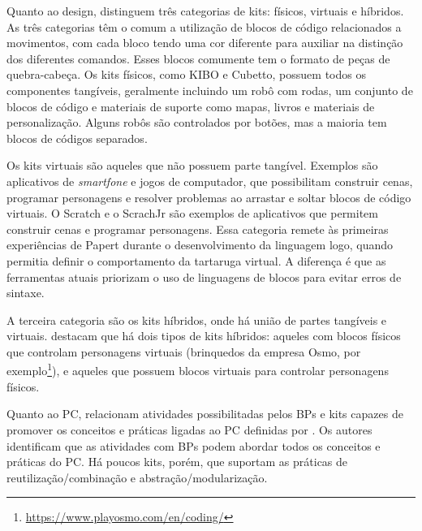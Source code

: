 Quanto ao design,  distinguem três categorias de kits: físicos, virtuais e híbridos. As três categorias têm o comum a utilização de blocos de código relacionados a movimentos, com cada bloco tendo uma cor diferente para auxiliar na distinção dos diferentes
comandos. Esses blocos comumente tem o formato de peças de quebra-cabeça. Os kits físicos, como KIBO e Cubetto, possuem todos os componentes tangíveis, geralmente incluindo um robô com rodas, um conjunto de blocos de código e materiais de suporte como mapas, livros e materiais de personalização. Alguns robôs são controlados por botões, mas a maioria tem blocos de códigos separados.

Os kits virtuais são aqueles que não possuem parte tangível. Exemplos são aplicativos de \textit{smartfone} e jogos de computador, que possibilitam construir cenas, programar personagens e resolver problemas ao arrastar e soltar blocos de código virtuais. O Scratch e o ScrachJr são exemplos de aplicativos que permitem construir cenas e programar personagens. Essa categoria remete às primeiras experiências de Papert durante o desenvolvimento da linguagem logo, quando permitia definir o comportamento da tartaruga virtual. A diferença é que as ferramentas atuais
priorizam o uso de linguagens de blocos para evitar erros de sintaxe.

A terceira categoria são os kits híbridos, onde há união de partes tangíveis e virtuais.  destacam que há dois tipos de kits híbridos: aqueles com blocos físicos que controlam personagens virtuais (brinquedos da empresa Osmo, por exemplo\footnote{\url{https://www.playosmo.com/en/coding/}}), e aqueles que possuem blocos virtuais para controlar personagens físicos.

Quanto ao \acl{PC},  relacionam atividades possibilitadas pelos BPs e kits capazes de promover os conceitos e práticas ligadas ao \ac{PC} definidas por . Os autores identificam que as atividades com BPs podem abordar todos os conceitos e práticas do \ac{PC}. Há poucos kits, porém, que suportam as práticas de reutilização/combinação e abstração/modularização.

